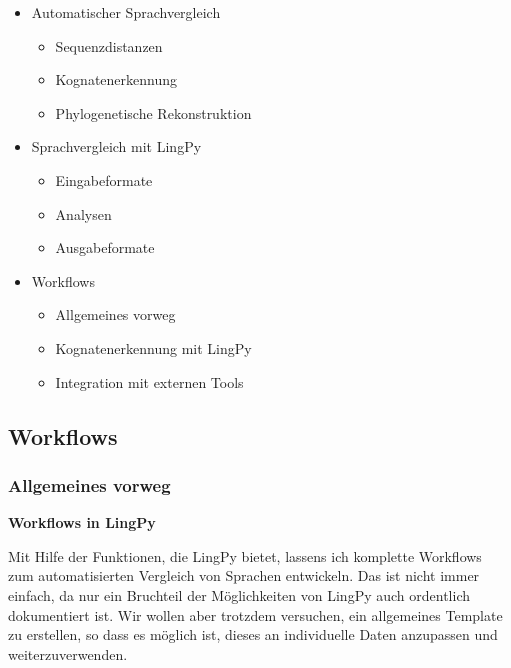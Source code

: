 \begin{itemize}
\itemsep1pt\parskip0pt
\item
  {Automatischer Sprachvergleich}

  \begin{itemize}
  \itemsep1pt\parskip0pt
  \item
    {Sequenzdistanzen}
  \item
    {Kognatenerkennung}
  \item
    {Phylogenetische Rekonstruktion}
  \end{itemize}
\item
  {Sprachvergleich mit LingPy}

  \begin{itemize}
  \itemsep1pt\parskip0pt
  \item
    {Eingabeformate}
  \item
    {Analysen}
  \item
    {Ausgabeformate}
  \end{itemize}
\item
  {Workflows}

  \begin{itemize}
  \itemsep1pt\parskip0pt
  \item
    {Allgemeines vorweg}
  \item
    {Kognatenerkennung mit LingPy}
  \item
    {Integration mit externen Tools}
  \end{itemize}
\end{itemize}

\subsection{\texorpdfstring{{Workflows}}{Workflows}}

\subsubsection{\texorpdfstring{{Allgemeines
vorweg}}{Allgemeines vorweg}}

\textbf{Workflows in LingPy}

Mit Hilfe der Funktionen, die LingPy bietet, lassens ich komplette
Workflows zum automatisierten Vergleich von Sprachen entwickeln. Das ist
nicht immer einfach, da nur ein Bruchteil der Möglichkeiten von LingPy
auch ordentlich dokumentiert ist. Wir wollen aber trotzdem versuchen,
ein allgemeines Template zu erstellen, so dass es möglich ist, dieses an
individuelle Daten anzupassen und weiterzuverwenden.


